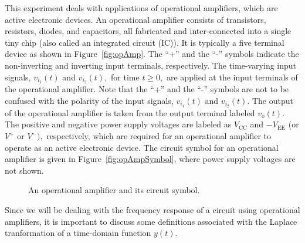 This experiment deals with applications of operational amplifiers, which are active electronic devices. An operational amplifier consists of transistors, resistors, diodes, and capacitors, all fabricated and inter-connected into a single tiny chip (also called an integrated circuit (IC)). It is typically a five terminal device as shown in Figure~\ref{fig:opAmp}.  The ``+'' and the ``-'' symbols indicate the non-inverting and inverting input terminals, respectively. The time-varying input signals, $v_{i_1}(t)$ and $v_{i_2}(t),$ for time $t\ge 0,$ are applied at the input terminals of the operational amplifier. Note that the ``+'' and the ``-'' symbols are not to be confused with the polarity of the input signals, $v_{i_1}(t)$ and $v_{i_2}(t).$ The output of the operational amplifier is taken from the output terminal labeled $v_o(t).$   The positive and negative power supply voltages are labeled as $V_{\text{CC}}$ and $-V_{\text{EE}}$ (or $V^+$ or $V^-),$ respectively, which are required for an operational amplifier to operate as an active electronic device. The circuit symbol for an operational amplifier is given in Figure~\ref{fig:opAmpSymbol}, where power supply voltages are not shown. %
%
\begin{figure}
  \centering
  \caption{ An operational amplifier and its  circuit symbol.}
  \label{fig:operationalAmplifier}
\end{figure}
%
Since we will be dealing with the frequency response of a circuit using operational amplifiers, it is important to discuss some definitions associated with the Laplace tranformation of a time-domain function $y(t).$

